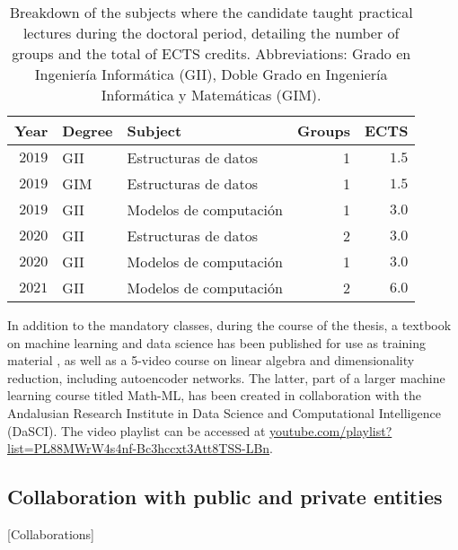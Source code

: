 \begin{table}[htbp]
    \begin{tabular}{rllrr}
        \toprule
        \bfseries Year & \bfseries Degree & \bfseries Subject &\bfseries  Groups &\bfseries  ECTS\\
        \midrule
        $2019$ & GII & Estructuras de datos & 1 & $1.5$\\
        $2019$ & GIM & Estructuras de datos & 1 & $1.5$\\
        $2019$ & GII & Modelos de computación & 1 & $3.0$\\
        $2020$ & GII & Estructuras de datos & 2 & $3.0$\\
        $2020$ & GII & Modelos de computación & 1 & $3.0$\\
        $2021$ & GII & Modelos de computación & 2 & $6.0$\\
        \bottomrule
    \end{tabular}
    \caption[Breakdown of the subjects where the candidate taught practical lectures.]{\label{tbl:classes}Breakdown of the subjects where the candidate taught practical lectures during the doctoral period, detailing the number of groups and the total of ECTS credits. Abbreviations: Grado en Ingeniería Informática (GII), Doble Grado en Ingeniería Informática y Matemáticas (GIM).}
\end{table}



In addition to the mandatory classes, during the course of the thesis, a textbook on machine learning and data science has been published for use as training material , as well as a 5-video course on linear algebra and dimensionality reduction, including autoencoder networks. The latter, part of a larger machine learning course titled Math-ML, has been created in collaboration with the Andalusian Research Institute in Data Science and Computational Intelligence (DaSCI). The video playlist can be accessed at \href{https://www.youtube.com/playlist?list=PL88MWrW4s4nf-Bc3hccxt3Att8TSS-LBn}{youtube.com/playlist?list=PL88MWrW4s4nf-Bc3hccxt3Att8TSS-LBn}.



\subsection{Collaboration with public and private entities}[Collaborations]

